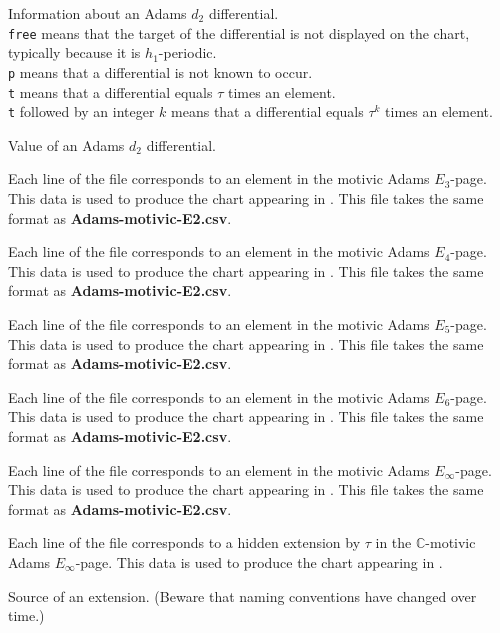 \documentclass{amsart}
\newcommand{\C}         {\mathbb{C}}
\begin{document}
Information about an Adams $d_2$ differential. \\
\texttt{free} means that the target of the differential is not displayed
on the chart, typically because it is $h_1$-periodic. \\
\texttt{p} means that a differential is not known to occur. \\
\texttt{t} means that a differential equals $\tau$ times an element. \\
\texttt{t} followed by an integer $k$ means that a differential
equals $\tau^k$ times an element.

Value of an Adams $d_2$ differential.

\newpage

Each line of the file corresponds to an element in the
motivic Adams $E_3$-page.  This data is used to produce the
chart appearing in \cite{IWX19c}.
This file takes the same format as
\textbf{Adams-motivic-E2.csv}.


Each line of the file corresponds to an element in the
motivic Adams $E_4$-page.  This data is used to produce the
chart appearing in \cite{IWX19c}.
This file takes the same format as
\textbf{Adams-motivic-E2.csv}.

Each line of the file corresponds to an element in the
motivic Adams $E_5$-page.  This data is used to produce the
chart appearing in \cite{IWX19c}.
This file takes the same format as
\textbf{Adams-motivic-E2.csv}.

Each line of the file corresponds to an element in the
motivic Adams $E_6$-page.  This data is used to produce the
chart appearing in \cite{IWX19c}.
This file takes the same format as
\textbf{Adams-motivic-E2.csv}.

Each line of the file corresponds to an element in the
motivic Adams $E_\infty$-page.  This data is used to produce the
chart appearing in \cite{IWX19c}.
This file takes the same format as
\textbf{Adams-motivic-E2.csv}.

\newpage


Each line of the file corresponds to a hidden extension by
$\tau$ in the
$\C$-motivic Adams $E_\infty$-page.  This data is used to produce the
chart appearing in \cite{IWX19c}.

  Source of an extension.
(Beware that naming conventions have changed over time.)
\end{document}
